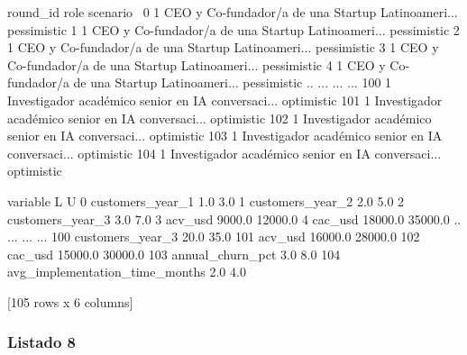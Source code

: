 \begin{APACode}
     round_id                                               role     scenario  \
0           1  CEO y Co-fundador/a de una Startup Latinoameri...  pessimistic   
1           1  CEO y Co-fundador/a de una Startup Latinoameri...  pessimistic   
2           1  CEO y Co-fundador/a de una Startup Latinoameri...  pessimistic   
3           1  CEO y Co-fundador/a de una Startup Latinoameri...  pessimistic   
4           1  CEO y Co-fundador/a de una Startup Latinoameri...  pessimistic   
..        ...                                                ...          ...   
100         1  Investigador académico senior en IA conversaci...   optimistic   
101         1  Investigador académico senior en IA conversaci...   optimistic   
102         1  Investigador académico senior en IA conversaci...   optimistic   
103         1  Investigador académico senior en IA conversaci...   optimistic   
104         1  Investigador académico senior en IA conversaci...   optimistic   

                           variable        L        U  
0                  customers_year_1      1.0      3.0  
1                  customers_year_2      2.0      5.0  
2                  customers_year_3      3.0      7.0  
3                           acv_usd   9000.0  12000.0  
4                           cac_usd  18000.0  35000.0  
..                              ...      ...      ...  
100                customers_year_3     20.0     35.0  
101                         acv_usd  16000.0  28000.0  
102                         cac_usd  15000.0  30000.0  
103                annual_churn_pct      3.0      8.0  
104  avg_implementation_time_months      2.0      4.0  

[105 rows x 6 columns]
\end{APACode}

\subsubsection{Listado 8}
\label{anexo:code-6-3-2-8}


